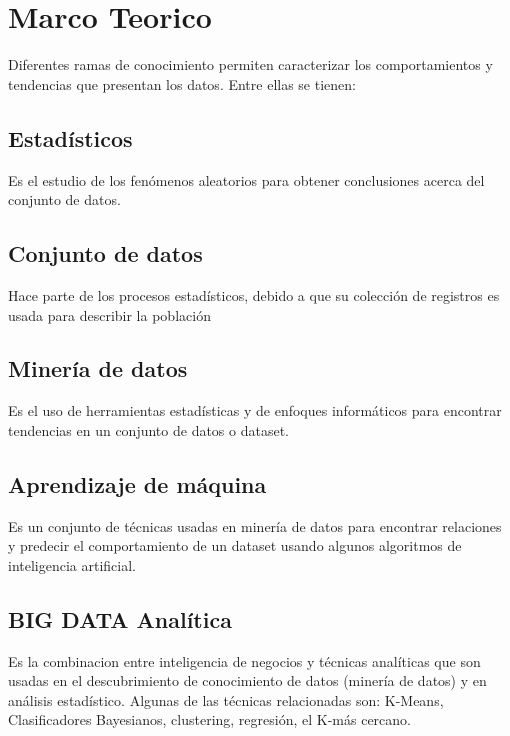\section{Marco Teorico}
Diferentes ramas de conocimiento permiten caracterizar los comportamientos y tendencias que presentan los datos. Entre ellas se tienen:
 \subsection{Estadísticos}
 Es el estudio de los fenómenos aleatorios para obtener conclusiones acerca del conjunto de datos.
 \subsection{Conjunto de datos}
 Hace parte de los procesos estadísticos, debido a que su colección de registros es usada para describir la población
 \subsection{Minería de datos}
 Es el uso de herramientas estadísticas y de enfoques informáticos para encontrar tendencias en un conjunto de datos o dataset.
 \subsection{Aprendizaje de máquina}
 Es un conjunto de técnicas usadas en minería de datos para encontrar relaciones y predecir el comportamiento de un dataset usando algunos algoritmos de inteligencia artificial.
 \subsection{BIG DATA Analítica}
 Es la combinacion entre inteligencia de negocios y técnicas analíticas que son usadas en el descubrimiento de conocimiento de datos (minería de datos) y en análisis estadístico. Algunas de las técnicas relacionadas son: K-Means, Clasificadores Bayesianos, clustering, regresión, el K-más cercano.
 

